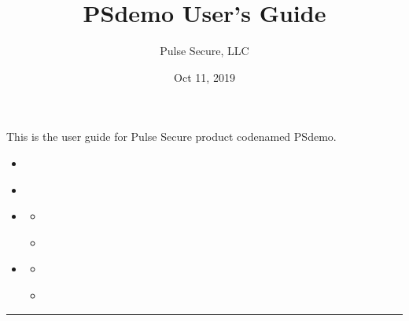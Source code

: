 \documentclass[letterpaper,10pt,english]{sphinxmanual}
\title{PSdemo User's Guide}
\date{Oct 11, 2019}
\author{Pulse Secure, LLC}
\begin{document}
\pagestyle{empty}
\sphinxmaketitle
\pagestyle{plain}
\sphinxtableofcontents
\pagestyle{normal}
\label{\detokenize{user-guide::doc}}


This is the user guide for Pulse Secure product codenamed PSdemo.

\begin{sphinxShadowBox}
\begin{itemize}
\item {} 
\label{\detokenize{user-guide:id1}}{\hyperref[\detokenize{user-guide:revision-history}]{}}

\item {} 
\label{\detokenize{user-guide:id2}}{\hyperref[\detokenize{user-guide:introduction}]{}}

\item {} 
\label{\detokenize{user-guide:id3}}{\hyperref[\detokenize{user-guide:section-a}]{}}
\begin{itemize}
\item {} 
\label{\detokenize{user-guide:id4}}{\hyperref[\detokenize{user-guide:part-1}]{}}

\item {} 
\label{\detokenize{user-guide:id5}}{\hyperref[\detokenize{user-guide:part-2}]{}}

\end{itemize}

\item {} 
\label{\detokenize{user-guide:id6}}{\hyperref[\detokenize{user-guide:section-b}]{}}
\begin{itemize}
\item {} 
\label{\detokenize{user-guide:id7}}{\hyperref[\detokenize{user-guide:how-to-do-xyz}]{}}

\item {} 
\label{\detokenize{user-guide:id8}}{\hyperref[\detokenize{user-guide:how-to-setup-mno}]{}}

\end{itemize}

\end{itemize}
\end{sphinxShadowBox}


\bigskip\hrule\bigskip
\end{document}
